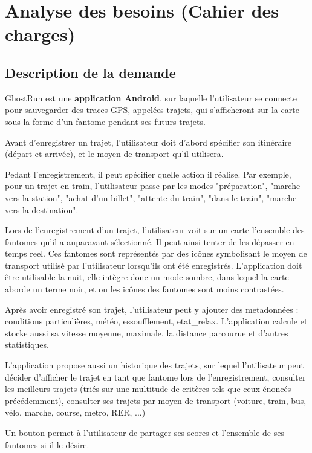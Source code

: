 \chapter{Analyse des besoins (Cahier des charges)}

\section{Description de la demande}

GhostRun est une \textbf{application Android}, sur laquelle l'utilisateur se connecte pour sauvegarder des traces GPS, appelées trajets, qui s'afficheront sur la carte sous la forme d'un \gls{fantome} pendant ses futurs trajets.

Avant d'enregistrer un trajet, l'utilisateur doit d'abord spécifier son itinéraire (départ et arrivée), et le moyen de transport qu'il utilisera. 

Pedant l'enregistrement, il peut spécifier quelle action il réalise. Par exemple, pour un trajet en train, l'utilisateur passe par les modes "préparation", "marche vers la station", "achat d'un billet", "attente du train", "dans le train", "marche vers la destination".

Lors de l'enregistrement d'un trajet, l'utilisateur voit sur un carte l'ensemble des \glspl{fantome} qu'il a auparavant sélectionné. Il peut ainsi tenter de les dépasser en temps reel. Ces \glspl{fantome} sont représentés par des icônes symbolisant le moyen de transport utilisé par l'utilisateur lorsqu'ils ont été enregistrés. L'application doit être utilisable la nuit, elle intègre donc un mode sombre, dans lequel la carte aborde un terme noir, et ou les icônes des \glspl{fantome} sont moins contrastées.

Après avoir enregistré son trajet, l'utilisateur peut y ajouter des metadonnées : conditions particulières, météo, essoufflement, \gls{etat_relax}. L'application calcule et stocke aussi sa vitesse moyenne, maximale, la distance parcourue et d'autres statistiques.

L'application propose aussi un historique des trajets, sur lequel l'utilisateur peut décider d'afficher le trajet en tant que \gls{fantome} lors de l'enregistrement, consulter les meilleurs trajets (triés sur une multitude de critères tels que ceux énoncés précédemment), consulter ses trajets par moyen de transport (voiture, train, bus, vélo, marche, course, metro, RER, ...)

Un bouton permet à l'utilisateur de partager ses scores et l'ensemble de ses \glspl{fantome} si il le désire.

